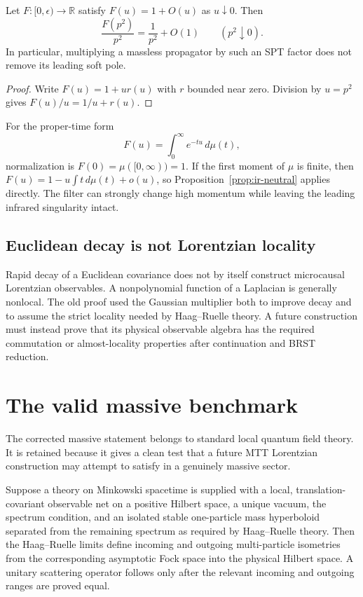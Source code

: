 \documentclass[11pt]{article}
\begin{document}
\begin{proposition}
\label{prop:ir-neutral}
Let $F:[0,\epsilon)\to\mathbb R$ satisfy
$F(u)=1+O(u)$ as $u\downarrow0$. Then
\[
 \frac{F(p^2)}{p^2}=\frac1{p^2}+O(1)
 \qquad (p^2\downarrow0).
\]
In particular, multiplying a massless propagator by such an SPT factor does
not remove its leading soft pole.
\end{proposition}

\begin{proof}
Write $F(u)=1+u r(u)$ with $r$ bounded near zero. Division by $u=p^2$
gives $F(u)/u=1/u+r(u)$.
\end{proof}

For the proper-time form
\[
 F(u)=\int_0^\infty e^{-tu}\,d\mu(t),
\]
normalization is $F(0)=\mu([0,\infty))=1$. If the first moment of $\mu$ is
finite, then $F(u)=1-u\int t\,d\mu(t)+o(u)$, so
Proposition~\ref{prop:ir-neutral} applies directly. The filter can strongly
change high momentum while leaving the leading infrared singularity intact.

\subsection{Euclidean decay is not Lorentzian locality}

Rapid decay of a Euclidean covariance does not by itself construct
microcausal Lorentzian observables. A nonpolynomial function of a Laplacian is
generally nonlocal. The old proof used the Gaussian multiplier both to improve
decay and to assume the strict locality needed by Haag--Ruelle theory. A
future construction must instead prove that its physical observable algebra
has the required commutation or almost-locality properties after continuation
and BRST reduction.

\section{The valid massive benchmark}

The corrected massive statement belongs to standard local quantum field
theory. It is retained because it gives a clean test that a future MTT
Lorentzian construction may attempt to satisfy in a genuinely massive sector.

\begin{theorem}
\label{thm:massive}
Suppose a theory on Minkowski spacetime is supplied with a local,
translation-covariant observable net on a positive Hilbert space, a unique
vacuum, the spectrum condition, and an isolated stable one-particle mass
hyperboloid separated from the remaining spectrum as required by
Haag--Ruelle theory. Then the Haag--Ruelle limits define incoming and outgoing
multi-particle isometries from the corresponding asymptotic Fock space into
the physical Hilbert space. A unitary scattering operator follows only after
the relevant incoming and outgoing ranges are proved equal.
\end{theorem}
\end{document}
